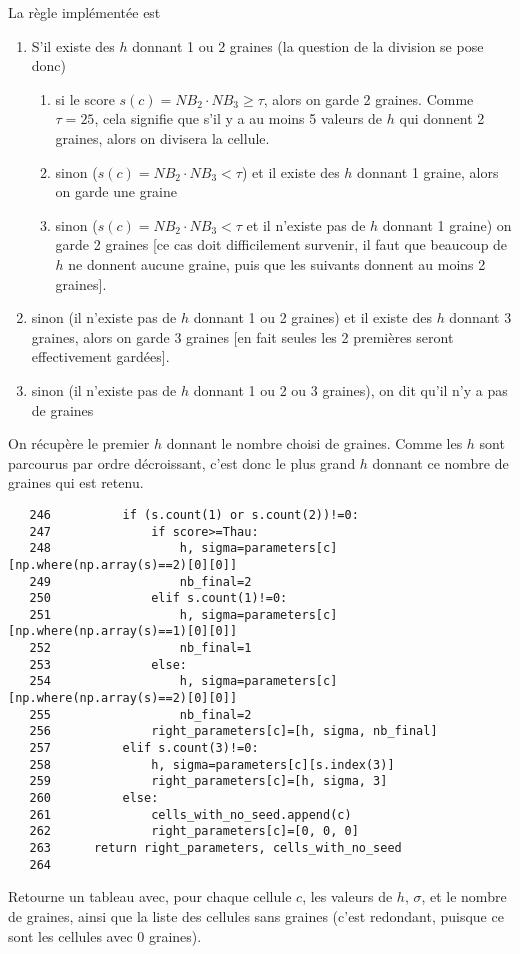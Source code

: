\documentclass{article}
\def \mycolor {red}
\begin{document}
La r\`egle impl\'ement\'ee est 
\begin{enumerate}
\itemsep -0.5ex
\item S'il existe des $h$ donnant 1 ou 2 graines (la question de la division se pose donc)
\begin{enumerate}
\itemsep -0.5ex
\item si le score $s(c) = NB_2 \cdot NB_3 \geq \tau$, alors on garde 2 graines. Comme $\tau = 25$, cela signifie que s'il y a au moins 5 valeurs de $h$ qui donnent 2 graines, alors on divisera la cellule.
\item sinon ($s(c) = NB_2 \cdot NB_3 <\tau$) et il existe des $h$ donnant 1 graine, alors on garde une graine
\item sinon ($s(c) = NB_2 \cdot NB_3 <\tau$ et il n'existe pas de $h$ donnant 1 graine) on garde 2 graines [ce cas doit difficilement survenir, il faut que beaucoup de $h$ ne donnent aucune graine, puis que les suivants donnent au moins 2 graines].
\end{enumerate}
\item sinon (il n'existe pas de $h$ donnant 1 ou 2 graines) et il existe des $h$ donnant 3 graines, alors on garde 3 graines [en fait seules les 2 premi\`eres seront effectivement gard\'ees].
\item sinon  (il n'existe pas de $h$ donnant 1 ou 2 ou 3 graines), on dit qu'il n'y a pas de graines
\end{enumerate}
On r\'ecup\`ere le premier $h$ donnant le nombre choisi de graines. Comme les $h$ sont parcourus par ordre d\'ecroissant, c'est donc le plus grand $h$ donnant ce nombre de graines qui est retenu.
\color{black}
\begin{verbatim}
   246	        if (s.count(1) or s.count(2))!=0:
   247	            if score>=Thau:
   248	                h, sigma=parameters[c][np.where(np.array(s)==2)[0][0]]
   249	                nb_final=2
   250	            elif s.count(1)!=0:
   251	                h, sigma=parameters[c][np.where(np.array(s)==1)[0][0]]
   252	                nb_final=1
   253	            else:
   254	                h, sigma=parameters[c][np.where(np.array(s)==2)[0][0]]
   255	                nb_final=2
   256	            right_parameters[c]=[h, sigma, nb_final]
   257	        elif s.count(3)!=0:
   258	            h, sigma=parameters[c][s.index(3)]
   259	            right_parameters[c]=[h, sigma, 3]
   260	        else:
   261	            cells_with_no_seed.append(c)
   262	            right_parameters[c]=[0, 0, 0]
   263	    return right_parameters, cells_with_no_seed
   264	
\end{verbatim}
\color{\mycolor}
Retourne un tableau avec, pour chaque cellule $c$, les valeurs de $h$, $\sigma$, et le nombre de graines, ainsi que la liste des cellules sans graines (c'est redondant, puisque ce sont les cellules avec 0 graines).
\color{black}
\end{document}
